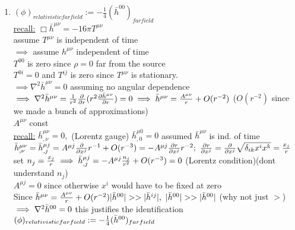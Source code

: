\documentclass[12pt]{amsart}
\begin{document}
\begin{enumerate}
\hdashrule[0.5ex][c]{\linewidth}{0.5pt}{1.5mm}


\item \underline{$(\phi)_{relativistic far field} := -\frac{1}{4} ( \bar{h}^{00})_{far field}$}\\
\underline{recall:} $\Box \bar{h}^{\mu \nu}= - 16 \pi T^{\mu \nu}$\\
assume $T^{\mu \nu}$ is independent of time\\
$\implies$ assume $h^{\mu \nu}$ independent of time\\
$T^{00}$ is zero since $\rho=0$ far from the source\\
$T^{0i} =0$ and $T^{ij}$ is zero since $T^{\mu \nu}$ is stationary.\\
$\implies \nabla^2 \bar{h}^{\mu \nu} = 0$ assuming no angular dependence\\
$\implies \nabla^2 \bar{h}^{\mu \nu} = \frac{1}{r^2} \frac{\partial}{\partial r} ( r^2 \frac{\partial \bar{h}^{\mu \nu}}{\partial r}) = 0 \\
\implies \bar{h}^{\mu \nu} = \frac{A^{\mu \nu}}{ r} + O(r^{-2})$ ($O(r^{-2})$ since we made a bunch of approximations)\\
$A^{\mu \nu}$ const\\
\underline{recall:} $\bar{h}^{\mu \nu}_{, \nu} = 0,$ (Lorentz gauge)$\,\, \bar{h}^{\mu 0}_{,0}=0$ assumed $\bar{h}^{\mu \nu}$ is ind. of time\\
$\bar{h}^{\mu \nu}_{, \nu} = \bar{h}^{\mu j}_{,j} = A^{\mu j} \frac{\partial}{\partial x^j} r^{-1} + O(r^{-3})\\
= - A^{\mu j} \frac{\partial r}{\partial x^j} r^{-2};\,\, \frac{\partial r}{\partial x^j} = \frac{\partial}{\partial x^j} \sqrt{\delta_{ik} x^i x^k} = \frac{x_j}{r}\\$
set $n_j =\frac{x_j}{r} \implies \bar{h}^{\mu j}_{,j} = - A^{\mu j} \frac{n_j}{r^2} + O(r^{-3})=0\\$ (Lorentz condition)(dont understand $n_j$)\\
$A^{\mu j} = 0$ since otherwise $x^i$ would have to be fixed at zero\\
Since $\bar{h}^{\mu \nu} = \frac{A^{\mu \nu}}{r} + O(r^{-2})\\
|\bar{h}^{00}|>> | \bar{h}^{ij}|,\,\, |\bar{h}^{00}|>> | \bar{h}^{00}|$ (why not just $>$)\\
$\implies \nabla^2 \bar{h}^{00}=0\\$
this justifies the identification\\
$(\phi)_{relativistic far field} := -\frac{1}{4} (\bar{h}^{00})_{far field}\\$



\end{enumerate}
\end{document}
